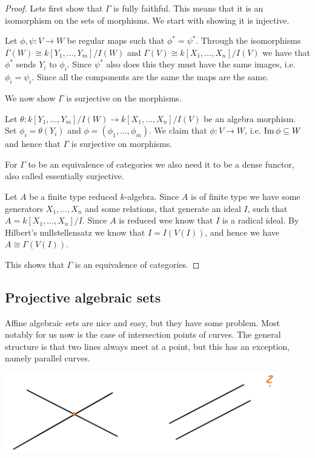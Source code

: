 \begin{proof}
Lets first show that $\Gamma$ is fully faithful. This means that it is an isomorphism on the sets of morphisms. We start with showing it is injective. 

Let $\phi, \psi\colon V\longrightarrow W$ be regular maps such that $\phi^*=\psi^*$. Through the isomorphisms $\Gamma(W)\cong k[Y_1, \ldots, Y_m]/I(W)$ and $\Gamma(V)\cong k[X_1, \ldots,X_n]/I(V)$ we have that $\phi^*$ sends $Y_i$ to $\phi_i$. Since $\psi^*$ also does this they must have the same images, i.e. $\phi_i = \psi_i$. Since all the components are the same the maps are the same. 

We now show $\Gamma$ is surjective on the morphisms. 

Let $\theta:k[Y_1, \ldots, Y_m]/I(W) \longrightarrow k[X_1, \ldots,X_n]/I(V)$ be an algebra morphism. Set $\phi_i = \theta(Y_i)$ and $\phi = (\phi_1, \ldots, \phi_m)$. We claim that $\phi:V\longrightarrow W$, i.e. $\operatorname{Im} \phi \subseteq W$ and hence that $\Gamma$ is surjective on morphisms. 

For $\Gamma$ to be an equivalence of categories we also need it to be a dense functor, also called essentially surjective. 

Let $A$ be a finite type reduced $k$-algebra. Since $A$ is of finite type we have some generators $X_1, \ldots, X_n$ and some relations, that generate an ideal $I$, such that $A=k[X_1, \ldots, X_n]/I$. Since $A$ is reduced wee know that $I$ is a radical ideal. By Hilbert's nullstellensatz we know that $I=I(V(I))$, and hence we have $A\cong \Gamma(V(I))$.

This shows that $\Gamma$ is an equivalence of categories. 
\end{proof}


\subsection{Projective algebraic sets}

Affine algebraic sets are nice and easy, but they have some problem. Most notably for us now is the case of intersection points of curves. The general structure is that two lines always meet at a point, but this has an exception, namely parallel curves. 

\begin{center}
\includegraphics[width=12cm]{img/lecture_5/projective1.png}
\end{center}

